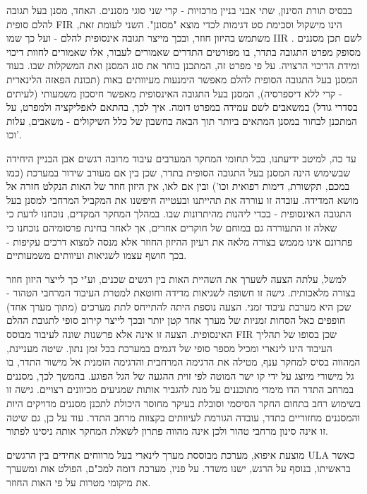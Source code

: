 בבסיס תורת הסינון, שתי אבני בניין מרכזיות - קרי שני סוגי מסננים.
האחד, מסנן בעל תגובה להלם סופית 
\textenglish{FIR}
הינו מישקול וסכימת סט דגימות לכדי מוצא "מסונן".
השני לעומת זאת, משתמש בהיזון חוזר, ובכך מייצר תגובה אינסופית להלם - ועל כך שמו
\textenglish{IIR}
.
לשם תכן מסננים מסופק מפרט התגובה בתדר, בו מפורטים התדרים שאמורים לעבור, אלו שאמורים לחוות דיכוי ומידת הדיכוי הרצויה.
על פי מפרט זה, המתכנן בוחר את סוג המסנן ואת המשקלות שבו.
בעוד המסנן בעל התגובה הסופית להלם מאפשר הימנעות מעיוותים באות (תכונת הפאזה הלינארית - קרי ללא דיספרסיה), המסנן בעל התגובה האינסופית מאפשר חיסכון משמעותי (לעיתים בסדרי גודל) במשאבים לשם עמידה במפרט דומה.
איך לכך, בהתאם לאפליקציה ולמפרט, על המתכנן לבחור במסנן המתאים ביותר תוך הבאה בחשבון של כלל השיקולים - משאבים, עלות וכו'.
\par
עד כה, למיטב ידיעתנו, בכל תחומי המחקר המערבים עיבוד מרובה רגשים אבן הבניין היחידה שבשימוש הינה המסנן בעל התגובה הסופית בתדר, שכן בין אם מעורב שידור במערכת (כמו במכם, תקשורת, דימות רפואית וכו') ובין אם לאו, אין היזון חוזר של האות הנקלט חזרה אל מושא המדידה.
עובדה זו עוררה את תהייתנו ובעטייה חיפשנו את המקביל המרחבי למסנן בעל התגובה האינסופית - בכדי ליהנות מהיתרונות שבו.
במהלך המחקר המקדים, נוכחנו לדעת כי שאלה זו התעוררה גם במוחם של חוקרים אחרים, אך לאחר בחינת פרסומיהם נוכחנו כי פתרונם אינו מממש בצורה מלאה את רעיון ההיזון החוזר אלא מנסה למצוא דרכים עקיפות - בכך חושף עצמו לשגיאות ועיוותים משמעותיים.
\par
למשל, עלתה הצעה לשערך את השהיית האות בין רגשים שכנים, וע"י כך לייצר היזון חוזר בצורה מלאכותית.
גישה זו חשופה לשגיאות מדידה וחוטאת למטרת העיבוד המרחבי הטהור - שכן היא מערבת עיבוד זמני.
הצעה נוספת היתה להתייחס לתת מערכים (מתוך מערך אחד) חופפים כאל הסחות זמניות של מערך אחד קטן יותר ובכך לייצר קירוב סופי לתגובת ההלם האינסופית.
הצעה זו אינה אלא פרשנות שונה לעיבוד מבוסס 
\textenglish{FIR}
שכן בסופו של תהליך העיבוד הינו לינארי ומכיל מספר סופי של דגמים במערכת בכל זמן נתון.
שיטה מעניינת, המהווה בסיס למחקר ענף, מטילה את הדגימה המרחבית והדגימה הזמנית אל מישור התדר, בו גל מישורי מיוצג על ידי קו ישר המוטה לפי זוית ההגעה של הגל הפוגע.
בהמשך לכך, מסננים במרחב התדר הדו מימדי מתוכננים על מנת להגביר אותות שמגיעים מכיוונים רצויים.
גישה זו בשימוש רחב בתחום החקר הסיסמי וסובלת בעיקר מחוסר היכולת לתכנן מסננים מדויקים היות והמסננים מחזוריים בתדר, עובדה הגורמת לעיוותים בקצוות מרחב התדר.
עוד על כן, גם שיטה זו אינה סינון מרחבי טהור ולכן אינה מהווה פתרון לשאלת המחקר אותה ניסינו לפתור.
\par
מוצעת איפוא, מערכת מבוססת מערך לינארי בעל מרווחים אחידים בין הרגשים
\textenglish{ULA}
כאשר בראשיתו, בנוסף על הרגש, ישנו משדר.
על פניו, מערכת דומה למכ"ם, הפולט אות ומשערך את מיקומי מטרות על פי האות החוזר.
